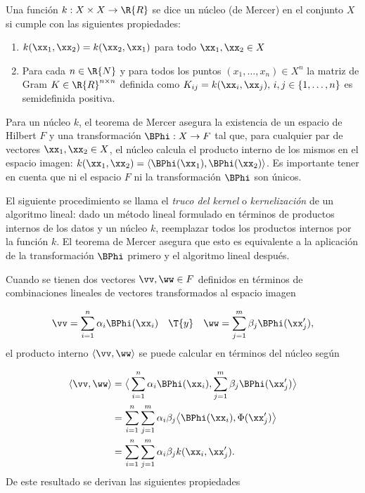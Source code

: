 \begin{definicion}
[Núcleo]
  Una función $k:X\times{}X\rightarrow{}\R{R}$ se dice un núcleo (de
  Mercer) en el conjunto $X$ si cumple con las siguientes propiedades:
  \begin{enumerate}
  \item $k(\xx_1,\xx_2)=k(\xx_2,\xx_1)$ para todo $\xx_1,\xx_2\in{}X$
  \item Para cada $n\in\R{N}$ y para todos los puntos
    $(x_1,\ldots,x_n)\in{}X^n$ la matriz de Gram
    $K\in\R{R}^{n\times{}n}$ definida como
    $K_{ij}=k(\xx_i,\xx_j),\,i,j\in\{1,\ldots,n\}$ es semidefinida
    positiva.
  \end{enumerate}
\end{definicion}
Para un núcleo $k$, el teorema de Mercer \cite{mercer} asegura la
existencia de un espacio de Hilbert $F$ y una transformación
$\BPhi:X\rightarrow{}F$ tal que, para cualquier par de vectores
$\xx_1,\xx_2\in{}X$, el núcleo calcula el producto interno de los
mismos en el espacio imagen:
$k(\xx_1,\xx_2)=\langle\BPhi(\xx_1),\BPhi(\xx_2)\rangle$. Es
importante tener en cuenta que ni el espacio $F$ ni la transformación
$\BPhi$ son únicos.

El siguiente procedimiento se llama el \emph{truco del kernel} o
\emph{kernelización} de un algoritmo lineal: dado un método lineal
formulado en términos de productos internos de los datos y un núcleo
$k$, reemplazar todos los productos internos por la función $k$.  El
teorema de Mercer asegura que esto es equivalente a la aplicación de
la transformación $\BPhi$ primero y el algoritmo
lineal después.

Cuando se tienen dos vectores $\vv,\ww\in{}F$ definidos en términos
de combinaciones lineales de vectores transformados al espacio imagen

\begin{align*}
  \vv=\sum_{i=1}^{n}\alpha_i\BPhi(\xx_i) \quad\T{ y }\quad
  \ww=\sum_{j=1}^{m}\beta_j\BPhi(\xx_j'),
\end{align*}
el producto interno $\langle\vv,\ww\rangle$ se puede calcular en
términos del núcleo según

\begin{align}
  \langle \vv,\ww\rangle&=\big\langle\sum_{i=1}^{n}\alpha_i\BPhi(\xx_i),
      \sum_{j=1}^{m}\beta_j\BPhi(\xx_j')\big\rangle \notag\\
    &=\sum_{i=1}^{n}\sum_{j=1}^{m}
      \alpha_i\beta_j\big\langle\BPhi(\xx_i),\Phi(\xx_j')\big\rangle\notag\\
    &=\sum_{i=1}^{n}\sum_{j=1}^{m} \alpha_i\beta_jk(\xx_i,\xx_j').
\end{align}
De este resultado se derivan las siguientes propiedades

